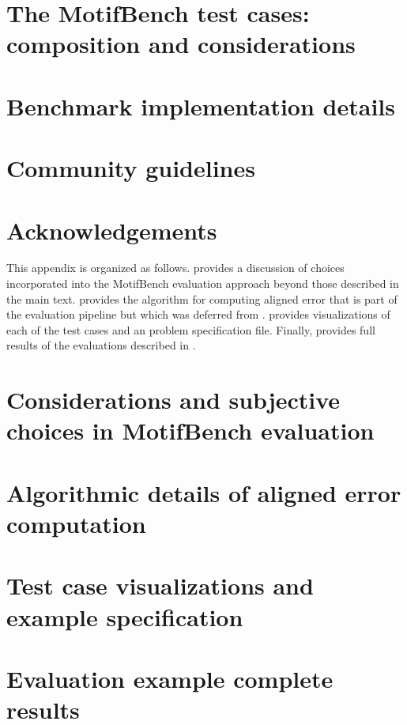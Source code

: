 \documentclass{article}
\begin{document}
\section{The MotifBench test cases: composition and considerations
}\label{sec:benchmark_cases}

%
%
\section{Benchmark implementation details}

%
\section{Community guidelines}


%
\section*{Acknowledgements}


\pagebreak



\newpage
\appendix
{}
\appendixpage

This appendix is organized as follows.
 provides a discussion of choices incorporated into the MotifBench evaluation approach beyond those described in the main text.
 provides the algorithm for computing aligned error that is part of the evaluation pipeline but which was deferred from .
 provides visualizations of each of the test cases and an problem specification file.
Finally,  provides full results of the evaluations described in .

\section{Considerations and subjective choices in MotifBench evaluation}\label{sec:considerations}


\section{Algorithmic details of aligned error computation}\label{sec:kabsch_alg}



\section{Test case visualizations and example specification}\label{sec:motif_vis}


%

\section{Evaluation example complete results}\label{sec:demo}

\end{document}
